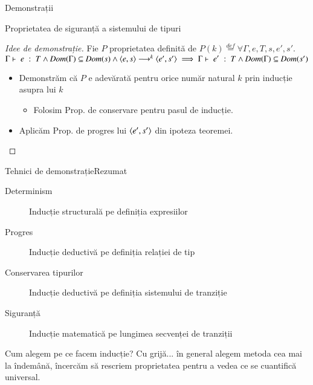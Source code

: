 \documentclass[xcolor=pdftex,romanian,colorlinks]{beamer}
\begin{document}
\begin{section}{Demonstrații}
\begin{frame}{Proprietatea de siguranță a sistemului de tipuri}
\begin{proof}[Idee de demonstrație]
 Fie $P$ proprietatea definită de 
\(P(k) \stackrel{def}{=} \forall \Gamma,e,T,s,e',s'. \)
\({\displaystyle \Gamma\vdash \; e \; : \; T} \wedge \mathop{\it Dom}(\Gamma)\subseteq\mathop{\it Dom}(s) \wedge {{\ensuremath \langle{e,s}\rangle}}\longrightarrow^k{{\langle{e',s'}\rangle}} \implies {\displaystyle \Gamma\vdash \; e' \; : \; T} \wedge \mathop{\it Dom}(\Gamma)\subseteq\mathop{\it Dom}(s')\)
\begin{itemize}
\item Demonstrăm că $P$ e adevărată pentru orice număr natural $k$ prin inducție asupra lui $k$ 
\begin{itemize}
\item Folosim Prop. de conservare pentru pasul de inducție.
\end{itemize}
\item Aplicăm Prop. de progres lui ${\langle{e',s'}\rangle}$ din ipoteza teoremei.
\end{itemize}
\end{proof}

\end{frame}

\begin{frame}{Tehnici de demonstrație}{Rezumat}
\begin{description}
\item[Determinism] Inducție structurală pe definiția expresiilor 
\item[Progres] Inducție deductivă pe definiția relației de tip 
\item[Conservarea tipurilor] Inducție deductivă pe definiția sistemului de tranziție 
\item[Siguranță] Inducție matematică pe lungimea secvenței de tranziții 
\end{description}

\begin{block}{Cum alegem pe ce facem inducție?}
Cu grijă... în general alegem metoda cea mai la îndemână, încercăm să rescriem proprietatea pentru a vedea ce se cuantifică universal.
\end{block}
\end{frame}


\end{section}
\end{document}
